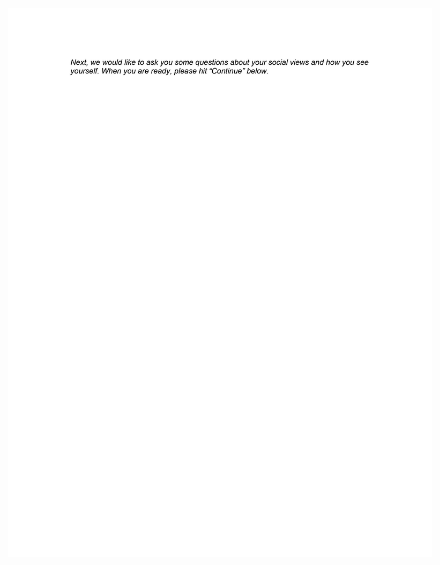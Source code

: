 \documentclass[12pt,econ]{sources/authesis}
\makeatletter
\def\maxwidth{\ifdim\Gin@nat@width>\linewidth\linewidth
\else\Gin@nat@width\fi}
\let\Oldincludegraphics\includegraphics
\renewcommand{\includegraphics}[1]{\Oldincludegraphics[width=\maxwidth]{#1}}
\makeatother
\begin{document}
\begin{figure}[hbt]
  \centering
\includegraphics{data/framing/appendix/questionnaire/questionnaire03.jpg}
\end{figure}
\end{document}
